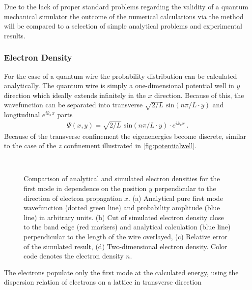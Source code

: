 Due to the lack of proper standard problems regarding the validity of a quantum mechanical simulator the outcome of the numerical calculations via the \gfnc{} method will be compared to a selection of simple analytical problems and experimental results.\par
\subsubsection{Electron Density}
For the case of a quantum wire the probability distribution can be calculated analytically. The quantum wire is simply a one-dimensional potential well in $y$ direction which ideally extends infinitely in the $x$ direction.
Because of this, the wavefunction can be separated into transverse $\sqrt{2/L}\text{ sin}(n\pi/L \cdot y)$ and longitudinal $e^{ik_xx}$ parts
\begin{align}
\Psi(x,y) = \sqrt{2/L}\text{ sin}(n\pi/L \cdot y) \cdot e^{ik_xx}\ .
\end{align}
Because of the transverse confinement the eigenenergies become discrete, similar to the case of the $z$ confinement illustrated in \cref{fig:potentialwell}.
\begin{figure}[h!]
  \begin{center}
 \qquad
    \\
    \qquad
    \caption{Comparison of analytical and simulated electron densities for the first mode in dependence on the position $y$ perpendicular to the direction of electron propagation $x$. (a) Analytical pure first mode wavefunction (dotted green line) and probability amplitude (blue line) in arbitrary units. (b) Cut of simulated electron density close to the band edge (red markers) and analytical calculation (blue line) perpendicular to the length of the wire overlayed, (c) Relative error of the simulated result, (d) Two-dimensional electron density. Color code denotes the electron density $n$. }\label{fig:mode1}
  \end{center}
\end{figure}
The electrons populate only the first mode at the calculated energy, using the dispersion relation of electrons on a lattice in transverse direction
